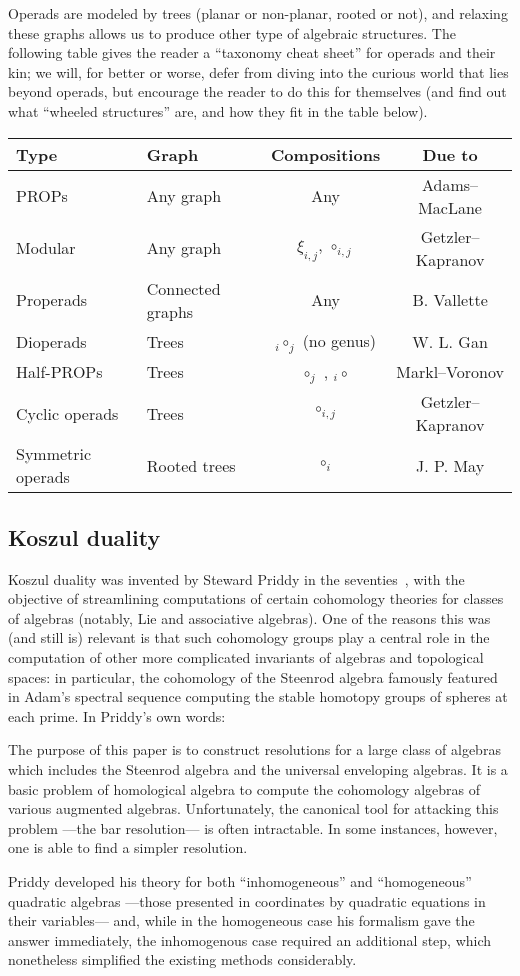 \documentclass[fleqn, a4paper, twoside]{article}
\makeatletter
\newcommand{\0}{\langle 0\rangle}
\let\[\@undefined
\DeclareRobustCommand{\[}{\begin{equation}}%
\let\]\@undefined
\DeclareRobustCommand{\]}{\end{equation}}%
\theoremstyle{mytheorem}
\theoremstyle{introthm}
\theoremstyle{mydefinition}
\theoremstyle{mydefinition2}
\theoremstyle{plain} %
\newcommand{\?}{\,?\,}
\theoremstyle{mytheorem}
\theoremstyle{plain} %
\newcommand\claim[2][.8]{%
  \begin{minipage}{#1\displaywidth}%
  \itshape
  #2
  \end{minipage}%
}
\makeatother
\begin{document}
Operads are modeled by trees (planar or
non-planar, rooted or not), and relaxing these
graphs allows us to produce other type of 
algebraic structures. The following table
gives the reader a ``taxonomy cheat sheet''
for operads and their kin; we will, for better
or worse, defer from diving into the curious
world that lies beyond operads, but encourage
the reader to do this for themselves (and find
out what ``wheeled structures'' are, and how
they fit in the table below).

\begin{center}
\begin{tabular}{@{}llcc@{}} \toprule
Type & Graph & Compositions & Due to \\ \midrule
PROPs & Any graph & Any  & Adams--MacLane \\
Modular & Any graph & $\xi_{i,j}$, $\circ_{i,j}$  & Getzler--Kapranov\\ 
Properads & Connected graphs & Any & B. Vallette \\
Dioperads & Trees & ${}_i\circ_j$ (no genus) & W. L. Gan \\
Half-PROPs & Trees & $\circ_j$ , ${}_i\circ$ & 
 Markl--Voronov \\ 
Cyclic operads & Trees &  $\circ_{i,j}$ & Getzler--Kapranov\\ 
Symmetric operads & Rooted trees & $\circ_i$  & J. P. May \\ 
\bottomrule
\end{tabular}
\end{center}

\subsection{Koszul duality}
Koszul duality was invented by Steward Priddy in
the seventies~\cite{Priddy1970}, with the objective of streamlining
computations of certain cohomology theories for
classes of algebras (notably, Lie and associative 
algebras). One of the reasons this was (and still is)
relevant is that such cohomology groups play a central
role in the computation of other more complicated invariants
of algebras and topological spaces: in particular,
the cohomology of the Steenrod algebra famously featured
in Adam's spectral sequence computing the stable homotopy
groups of spheres at each prime. In Priddy's own words:
\[
\claim{
The purpose of this paper is to construct resolutions for a 
large class of algebras which includes the Steenrod algebra
and the universal enveloping algebras. 
It is a basic problem of homological algebra to compute the 
cohomology algebras of various augmented algebras. Unfortunately, 
the canonical tool for attacking this problem ---the bar resolution--- is often intractable. In some instances,
however, one is able to find a simpler resolution.
}
\]
Priddy developed his theory for both ``inhomogeneous''
and ``homogeneous'' quadratic algebras ---those presented
in coordinates by quadratic equations in their variables---
and, while in the homogeneous case his formalism gave the
answer immediately, the inhomogenous case required an
additional step, which nonetheless simplified the existing
methods considerably.  
\end{document}
